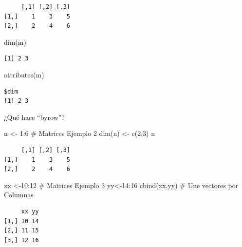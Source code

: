 \documentclass[
  letterpaper,
  DIV=11,
  numbers=noendperiod]{scrreprt}
\newenvironment{Shaded}{\begin{snugshade}}{\end{snugshade}}
\newcommand{\CommentTok}[1]{\textcolor[rgb]{0.37,0.37,0.37}{#1}}
\newcommand{\DecValTok}[1]{\textcolor[rgb]{0.68,0.00,0.00}{#1}}
\newcommand{\FunctionTok}[1]{\textcolor[rgb]{0.28,0.35,0.67}{#1}}
\newcommand{\NormalTok}[1]{\textcolor[rgb]{0.00,0.23,0.31}{#1}}
\newcommand{\OtherTok}[1]{\textcolor[rgb]{0.00,0.23,0.31}{#1}}
\newcommand{\SpecialCharTok}[1]{\textcolor[rgb]{0.37,0.37,0.37}{#1}}
\begin{document}
\begin{verbatim}
     [,1] [,2] [,3]
[1,]    1    3    5
[2,]    2    4    6
\end{verbatim}

\begin{Shaded}
\begin{Highlighting}[]
\FunctionTok{dim}\NormalTok{(m)}
\end{Highlighting}
\end{Shaded}

\begin{verbatim}
[1] 2 3
\end{verbatim}

\begin{Shaded}
\begin{Highlighting}[]
\FunctionTok{attributes}\NormalTok{(m)}
\end{Highlighting}
\end{Shaded}

\begin{verbatim}
$dim
[1] 2 3
\end{verbatim}

¿Qué hace ``byrow''?

\begin{Shaded}
\begin{Highlighting}[]
\NormalTok{n }\OtherTok{\textless{}{-}} \DecValTok{1}\SpecialCharTok{:}\DecValTok{6}     \CommentTok{\# Matrices Ejemplo 2}
\FunctionTok{dim}\NormalTok{(n) }\OtherTok{\textless{}{-}} \FunctionTok{c}\NormalTok{(}\DecValTok{2}\NormalTok{,}\DecValTok{3}\NormalTok{)}
\NormalTok{n}
\end{Highlighting}
\end{Shaded}

\begin{verbatim}
     [,1] [,2] [,3]
[1,]    1    3    5
[2,]    2    4    6
\end{verbatim}

\begin{Shaded}
\begin{Highlighting}[]
\NormalTok{xx }\OtherTok{\textless{}{-}}\DecValTok{10}\SpecialCharTok{:}\DecValTok{12}   \CommentTok{\# Matrices Ejemplo 3}
\NormalTok{yy}\OtherTok{\textless{}{-}}\DecValTok{14}\SpecialCharTok{:}\DecValTok{16}
\FunctionTok{cbind}\NormalTok{(xx,yy) }\CommentTok{\# Une vectores por Columnas}
\end{Highlighting}
\end{Shaded}

\begin{verbatim}
     xx yy
[1,] 10 14
[2,] 11 15
[3,] 12 16
\end{verbatim}
\end{document}
